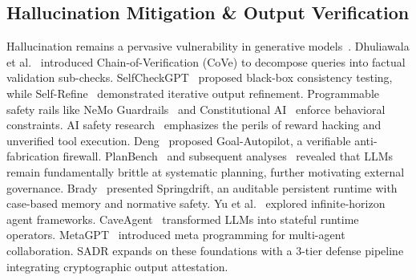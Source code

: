 \documentclass[10pt,journal,compsoc]{IEEEtran}
\begin{document}
\subsection{Hallucination Mitigation \& Output Verification}
Hallucination remains a pervasive vulnerability in generative models~\cite{huang2023survey_hallucination, ji2023survey_hallucination}. Dhuliawala et al.~\cite{dhuliawala2023cove} introduced Chain-of-Verification (CoVe) to decompose queries into factual validation sub-checks. SelfCheckGPT~\cite{manakul2023selfcheck} proposed black-box consistency testing, while Self-Refine~\cite{madaan2023selfrefine} demonstrated iterative output refinement. Programmable safety rails like NeMo Guardrails~\cite{rebedea2023nemoguardrails} and Constitutional AI~\cite{bai2022constitutional} enforce behavioral constraints. AI safety research~\cite{casper2023openproblems, amodei2016concrete, hendrycks2021unsolved} emphasizes the perils of reward hacking and unverified tool execution. Deng~\cite{deng2026autopilot} proposed Goal-Autopilot, a verifiable anti-fabrication firewall. PlanBench~\cite{valmeekam2023planbench} and subsequent analyses~\cite{kambhampati2024cantplan} revealed that LLMs remain fundamentally brittle at systematic planning, further motivating external governance. Brady~\cite{brady2026springdrift} presented Springdrift, an auditable persistent runtime with case-based memory and normative safety. Yu et al.~\cite{yu2026infiagent} explored infinite-horizon agent frameworks. CaveAgent~\cite{ran2026caveagent} transformed LLMs into stateful runtime operators. MetaGPT~\cite{hong2024metagpt} introduced meta programming for multi-agent collaboration. SADR expands on these foundations with a 3-tier defense pipeline integrating cryptographic output attestation.
\end{document}
